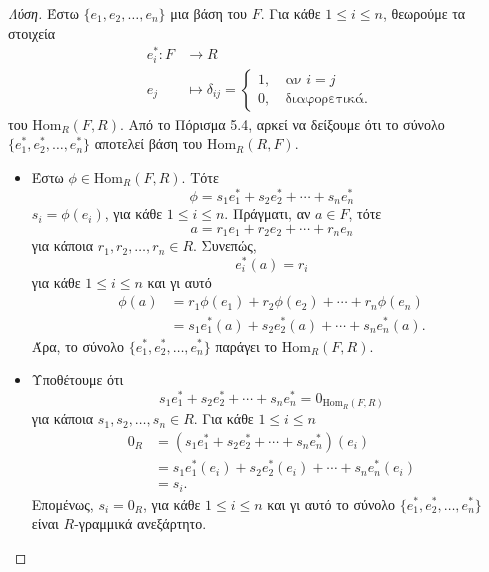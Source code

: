 \documentclass[12pt,a4paper,reqno]{amsart}
\theoremstyle{definition}
\renewcommand{\to}{\rightarrow}
\newcommand{\Hom}{\mathrm{Hom}}
\begin{document}
\begin{proof}[Λύση]
  Έστω $\{e_1, e_2, \dots, e_n\}$ μια βάση του $F$. Για κάθε $1 \le i \le n$, θεωρούμε τα στοιχεία
  \begin{align*}
    e_i^\ast : F &\to R \\
    e_j &\mapsto \delta_{ij} = 
  \begin{cases}
    1, &\ \text{αν $i=j$} \\
    0, &\ \text{διαφορετικά}.
  \end{cases}
  \end{align*}
 του $\Hom_R(F,R)$. Από το Πόρισμα 5.4, αρκεί να δείξουμε ότι το σύνολο $\{e_1^\ast, e_2^\ast, \dots, e_n^\ast\}$ αποτελεί βάση του $\Hom_R(R,F)$.
  \begin{itemize}
    \item Έστω $\phi \in \Hom_R(F,R)$. Τότε 
    \[
    \phi = s_1e_1^\ast + s_2e_2^\ast + \cdots + s_ne_n^\ast
    \] 
    $s_i = \phi(e_i)$, για κάθε $1 \le i \le n$. Πράγματι, αν $a \in F$, τότε 
    \[
    a = r_1e_1 + r_2e_2 + \cdots + r_ne_n
    \]
    για κάποια $r_1, r_2, \dots, r_n \in R$. Συνεπώς,  
    \[
    e_i^\ast(a) = r_i
    \]
    για κάθε $1 \le i \le n$ και γι αυτό 
    \begin{align*}
    \phi(a) 
    &= r_1\phi(e_1) + r_2\phi(e_2) + \cdots + r_n\phi(e_n) \\ 
    &= s_1e_1^\ast(a) + s_2e_2^\ast(a) + \cdots + s_ne_n^\ast(a).
    \end{align*}
    Άρα, το σύνολο $\{e_1^\ast, e_2^\ast, \dots, e_n^\ast\}$ παράγει το $\Hom_R(F,R)$.

    \item Υποθέτουμε ότι 
    \[
    s_1e_1^\ast + s_2e_2^\ast + \cdots + s_ne_n^\ast = 0_{\Hom_R(F,R)}
    \]
    για κάποια $s_1, s_2, \dots, s_n \in R$. Για κάθε $1 \le i \le n$ 
    \begin{align*}
      0_R &= \left(
        s_1e_1^\ast + s_2e_2^\ast + \cdots + s_ne_n^\ast
      \right)(e_i) \\
      &= s_1e_1^\ast(e_i) + s_2e_2^\ast(e_i) + \cdots + s_ne_n^\ast(e_i) \\
      &= s_i.
    \end{align*}
    Επομένως,  $s_i = 0_R$, για κάθε $1 \le i \le n$ και γι αυτό το σύνολο $\{e_1^\ast, e_2^\ast, \dots, e_n^\ast\}$ είναι $R$-γραμμικά ανεξάρτητο.
  \end{itemize}
\end{proof}
\end{document}
